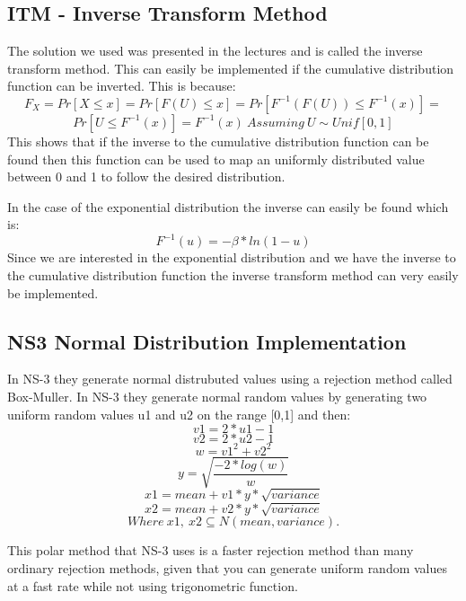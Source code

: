 \documentclass{article}
\begin{document}
  \subsection{ITM - Inverse Transform Method}
  The solution we used was presented in the lectures and is called the inverse transform method.
  This can easily be implemented if the cumulative distribution function can be inverted.
  This is because:
  $$ F_{X}=Pr[X \leqslant x]=Pr[F(U) \leqslant x]=Pr[F^{-1}(F(U)) \leqslant F^{-1}(x)]= $$
  $$ Pr[U \leqslant F^{-1}(x)]=F^{-1}(x)\ Assuming\ U \sim Unif[0,1] $$
  This shows that if the inverse to the cumulative distribution function can be found then this function can be used to map an uniformly distributed value between 0 and 1 to follow the desired distribution.
  
  In the case of the exponential distribution the inverse can easily be found which is:
  $$ F^{-1}(u)=-\beta * ln(1-u) $$
  Since we are interested in the exponential distribution and we have the inverse to the cumulative distribution function the inverse transform method can very easily be implemented.
  
  \subsection{NS3 Normal Distribution Implementation}
  In NS-3 they generate normal distrubuted values using a rejection method called Box-Muller. In NS-3 they generate normal random values by generating two uniform random values u1 and u2 on the range [0,1] and then:
  $$v1 = 2 * u1 - 1$$
  $$v2 = 2 * u2 - 1$$
  $$w = v1^2 + v2^2$$
  $$y = \sqrt{\frac{-2*log(w)}{w}}$$
  $$x1 = mean + v1 * y * \sqrt{variance}$$
  $$x2 = mean + v2 * y * \sqrt{variance}$$
  $$Where\ x1,\ x2 \subseteq N(mean,variance).$$
  
  This polar method that NS-3 uses is a faster rejection method than many ordinary rejection methods, given that you can generate uniform random values at a fast rate while not using trigonometric function. 
\end{document}
